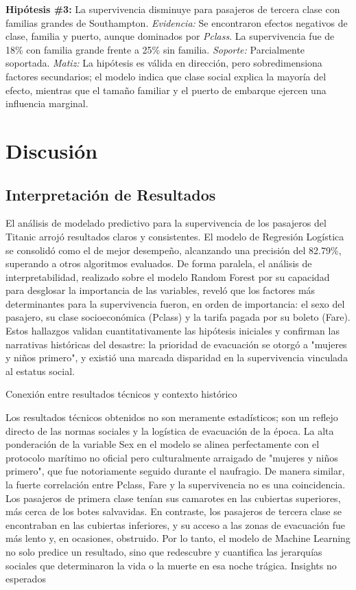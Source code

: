 \documentclass[conference]{IEEEtran}
\begin{document}
\medskip

\textbf{Hipótesis \#3:} La supervivencia disminuye para pasajeros de tercera clase con familias grandes de Southampton.  
\textit{Evidencia:} Se encontraron efectos negativos de clase, familia y puerto, aunque dominados por \textit{Pclass}. La supervivencia fue de 18\% con familia grande frente a 25\% sin familia.  
\textit{Soporte:} Parcialmente soportada.  
\textit{Matiz:} La hipótesis es válida en dirección, pero sobredimensiona factores secundarios; el modelo indica que clase social explica la mayoría del efecto, mientras que el tamaño familiar y el puerto de embarque ejercen una influencia marginal.




\section{Discusión}
\subsection{Interpretación de Resultados}

El análisis de modelado predictivo para la supervivencia de los pasajeros del Titanic arrojó resultados claros y consistentes. El modelo de Regresión Logística se consolidó como el de mejor desempeño, alcanzando una precisión del 82.79\%, superando a otros algoritmos evaluados. De forma paralela, el análisis de interpretabilidad, realizado sobre el modelo Random Forest por su capacidad para desglosar la importancia de las variables, reveló que los factores más determinantes para la supervivencia fueron, en orden de importancia: el sexo del pasajero, su clase socioeconómica (Pclass) y la tarifa pagada por su boleto (Fare). Estos hallazgos validan cuantitativamente las hipótesis iniciales y confirman las narrativas históricas del desastre: la prioridad de evacuación se otorgó a "mujeres y niños primero", y existió una marcada disparidad en la supervivencia vinculada al estatus social.

Conexión entre resultados técnicos y contexto histórico

Los resultados técnicos obtenidos no son meramente estadísticos; son un reflejo directo de las normas sociales y la logística de evacuación de la época. La alta ponderación de la variable Sex en el modelo se alinea perfectamente con el protocolo marítimo no oficial pero culturalmente arraigado de "mujeres y niños primero", que fue notoriamente seguido durante el naufragio. De manera similar, la fuerte correlación entre Pclass, Fare y la supervivencia no es una coincidencia. Los pasajeros de primera clase tenían sus camarotes en las cubiertas superiores, más cerca de los botes salvavidas. En contraste, los pasajeros de tercera clase se encontraban en las cubiertas inferiores, y su acceso a las zonas de evacuación fue más lento y, en ocasiones, obstruido. Por lo tanto, el modelo de Machine Learning no solo predice un resultado, sino que redescubre y cuantifica las jerarquías sociales que determinaron la vida o la muerte en esa noche trágica.
Insights no esperados
\end{document}
